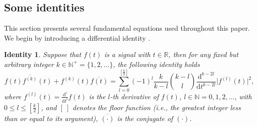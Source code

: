 \documentclass[preprint,12pt]{elsarticle}
\newtheorem{id}{Identity}
\begin{document}
\subsection{Some identities} 
This section presents several fundamental equations used throughout this paper. We begin by introducing a differential identity \cite{HPW}.

\begin{id}
	\label{id1}
	Suppose that $f(t)$ is a signal with $t \in \mathbb{R}$, then  for any fixed but arbitrary integer $k \in \mathbb{N}^+ = \{1,2,...\}$, the following identity holds
	\begin{equation}
	\label{6}
	f(t) \overline{f^{(k)}}(t)+f^{(k)}(t)\overline{f(t)} = \sum_{l=0}^{{[\frac{k}{2}]}} (-1)^l \frac{k}{k-l} \binom{k-l}{l} \frac{\mathrm{d}^{k-2l}}{\mathrm{d}t^{k-2l}} \lvert f^{(l)}(t) \rvert^2,
	\end{equation}
	where $f^{(l)} (t)= \frac{\mathrm{d}^l}{\mathrm{d}t^l}f(t)$ is the $l$-th derivative of $f(t)$, $l \in \mathbb{N} = {0,1,2,...}$, with $0 \leq l \leq [ \frac{k}{2} ]$, and $ [ \ ]$ denotes the floor function (i.e., the greatest integer less than or equal to its argument), $\overline{(\cdot)}$ is the conjugate of $(\cdot)$.
\end{id}
\end{document}
